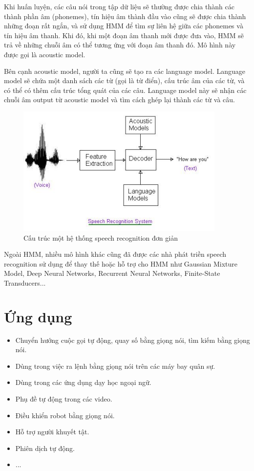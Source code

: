 Khi huấn luyện, các câu nói trong tập dữ liệu sẽ thường được chia thành các thành phần âm (phonemes), tín hiệu âm thành đầu vào cũng sẽ được chia thành những đoạn rất ngắn, và sử dụng HMM để tìm sự liên hệ giữa các phonemes và tín hiệu âm thanh. Khi đó, khi một đoạn âm thanh mới được đưa vào, HMM sẽ trả về những chuỗi âm có thể tương ứng với đoạn âm thanh đó. Mô hình này được gọi là acoustic model.

Bên cạnh acoustic model, người ta cũng sẽ tạo ra các language model. Language model sẽ chứa một danh sách các từ (gọi là từ điển), cấu trúc âm của các từ, và có thể có thêm cấu trúc tổng quát của các câu. Language model này sẽ nhận các chuỗi âm output từ acoustic model và tìm cách ghép lại thành các từ và câu.

\begin{figure}[h]
    \centering
    \includegraphics[scale=1]{SRSystem}\footnotemark
    \caption{Cấu trúc một hệ thống speech recognition đơn giản}
    \label{fig:c3_SRSystem}
\end{figure}


Ngoài HMM, nhiều mô hình khác cũng đã được các nhà phát triền speech recognition sử dụng để thay thế hoặc hỗ trợ cho HMM như Gaussian Mixture Model, Deep Neural Networks, Recurrent Neural Networks, Finite-State Transducers...

\section{Ứng dụng}

\begin{itemize}
    \item Chuyển hướng cuộc gọi tự động, quay số bằng giọng nói, tìm kiếm bằng giọng nói.
    \item Dùng trong việc ra lệnh bằng giọng nói trên các máy bay quân sự.
    \item Dùng trong các ứng dụng dạy học ngoại ngữ.
    \item Phụ đề tự động trong các video.
    \item Điều khiển robot bằng giọng nói.
    \item Hỗ trợ người khuyết tật.
    \item Phiên dịch tự động.
    \item ...
\end{itemize}

